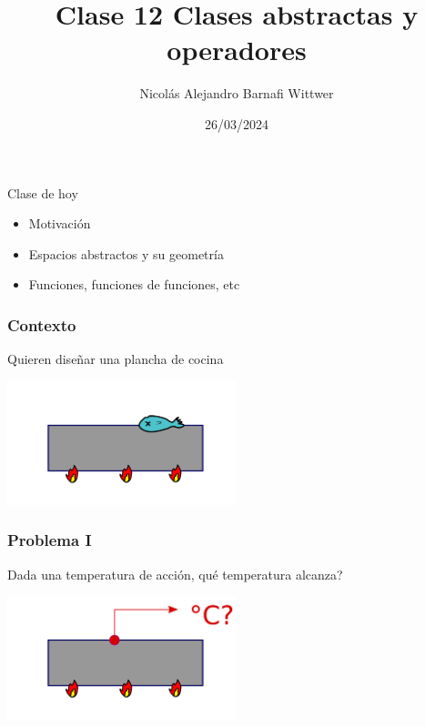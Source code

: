 \documentclass[12pt,aspectratio=169,xcolor=dvipsnames]{beamer}
\title[short title]{Clase 12 Clases abstractas y operadores}
\subtitle{}
\author[NA Barnafi] {Nicolás Alejandro Barnafi Wittwer}
\institute[UC|CMM] 
{
    Pontificia Universidad Católica de Chile \\
    Centro de Modelamiento Matemático
}
\date{26/03/2024}
\begin{document}
\begin{frame}
    \maketitle
\end{frame}
\begin{frame}{Clase de hoy}
    \begin{itemize}
        \item Motivación
        \item Espacios abstractos y su geometría
        \item Funciones, funciones de funciones, etc
    \end{itemize}

    \vspace{1cm}

\end{frame}
\begin{frame}\frametitle{Contexto}
Quieren diseñar una plancha de cocina

    \begin{center}
        \includegraphics[width=0.5\textwidth]{../images/plancha.png}
    \end{center}
\end{frame}
\begin{frame}\frametitle{Problema I}
    Dada una temperatura de acción, qué temperatura alcanza?

    \begin{center}
        \includegraphics[width=0.5\textwidth]{../images/plancha-medida.png}
    \end{center}

\end{frame}
\end{document}
